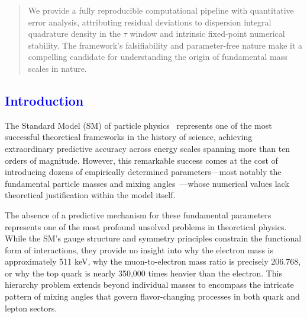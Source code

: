 \documentclass[%
amsmath,amssymb,
aps,
prb,
floatfix, showkeys, 10pt,
]{revtex4-2}
\newcommand{\modif}[1]{\textcolor{blue}{#1}}
\begin{document}
\begin{abstract}
We provide a fully reproducible computational pipeline with quantitative error analysis, attributing residual deviations to dispersion integral quadrature density in the $\tau$ window and intrinsic fixed-point numerical stability. The framework's falsifiability and parameter-free nature make it a compelling candidate for understanding the origin of fundamental mass scales in nature.
\end{abstract}


\maketitle

{\modif{
\section{Introduction}
\label{sec:introduction}
}}

The Standard Model (SM) of particle physics~\cite{SM-ref,weinberg-book,Weinberg1979} represents one of the most successful theoretical frameworks in the history of science, achieving extraordinary predictive accuracy across energy scales spanning more than ten orders of magnitude. However, this remarkable success comes at the cost of introducing dozens of empirically determined parameters—most notably the fundamental particle masses and mixing angles~\cite{PDG2022,PDG2025}—whose numerical values lack theoretical justification within the model itself.

The absence of a predictive mechanism for these fundamental parameters represents one of the most profound unsolved problems in theoretical physics. While the SM's gauge structure and symmetry principles constrain the functional form of interactions, they provide no insight into why the electron mass is approximately 511 keV, why the muon-to-electron mass ratio is precisely 206.768, or why the top quark is nearly 350,000 times heavier than the electron. This hierarchy problem extends beyond individual masses to encompass the intricate pattern of mixing angles that govern flavor-changing processes in both quark and lepton sectors.
\end{document}
